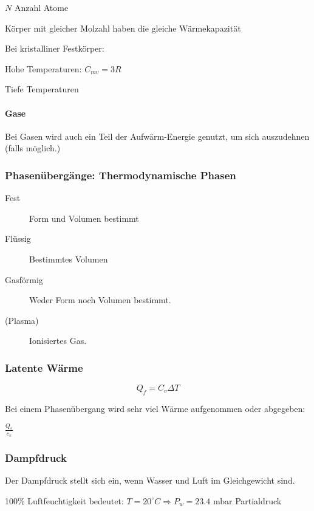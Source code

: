 \documentclass[a4paper]{scrartcl}
\begin{document}
$N$ Anzahl Atome


Körper mit gleicher Molzahl haben die gleiche Wärmekapazität


Bei kristalliner Festkörper:

Hohe Temperaturen: $C_{mv} = 3R$

Tiefe Temperaturen %

\paragraph{Gase}

Bei Gasen wird auch ein Teil der Aufwärm-Energie genutzt, um sich auszudehnen (falls möglich.)




\subsubsection{Phasenübergänge: Thermodynamische Phasen}

\begin{description}
	\item[Fest] Form und Volumen bestimmt
	\item[Flüssig] Bestimmtes Volumen
	\item[Gasförmig] Weder Form noch Volumen bestimmt.
	\item[(Plasma)] Ionisiertes Gas.
\end{description}


\subsubsection{Latente Wärme}


\[
Q_f = C_v \Delta T
\]


Bei einem Phasenübergang wird sehr viel Wärme aufgenommen oder abgegeben:

$ \frac{Q_s}{c_v}$




\subsubsection{Dampfdruck}


Der Dampfdruck stellt sich ein, wenn Wasser und Luft im Gleichgewicht sind.

100\% Luftfeuchtigkeit bedeutet: $T = 20^\circ C \Rightarrow P_w = 23.4$ mbar Partialdruck
\end{document}
